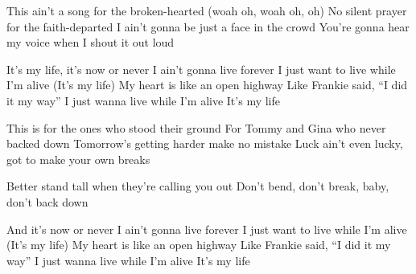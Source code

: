 \medskip

\begin{guitar}
  This ain't a song for the broken-hearted (woah oh, woah oh, oh)
  No silent prayer for the faith-departed
  I ain't gonna be just a face in the crowd
  You're gonna hear my voice when I shout it out loud

  \smallskip
  It's my life, it's now or never
  I ain't gonna live forever
  I just want to live while I'm alive
  (It's my life) My heart is like an open highway
  Like Frankie said, ``I did it my way''
  I just wanna live while I'm alive
  It's my life
  \smallskip

  This is for the ones who stood their ground
  For Tommy and Gina who never backed down
  Tomorrow's getting harder make no mistake
  Luck ain't even lucky, got to make your own breaks


  Better stand tall when they're calling you out
  Don't bend, don't break, baby, don't back down


  And it's now or never
  I ain't gonna live forever
  I just want to live while I'm alive
  (It's my life) My heart is like an open highway
  Like Frankie said, ``I did it my way''
  I just wanna live while I'm alive
  It's my life
\end{guitar}
